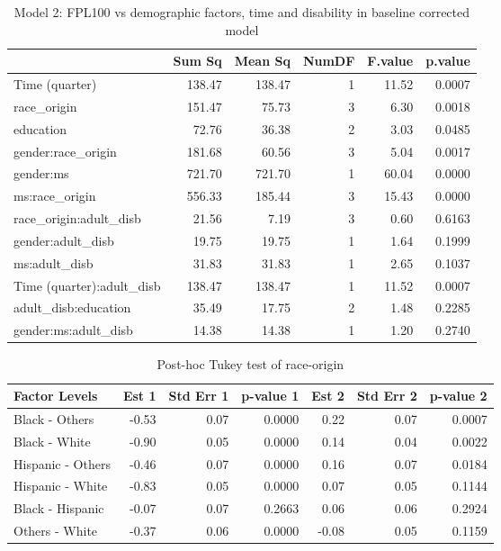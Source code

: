 \documentclass[11pt]{extarticle} %
\begin{document}
\noindent
\begin{table}[H]
\footnotesize
\centering
\begin{tabular}{lrrrrr}
  \hline
 & Sum Sq & Mean Sq & NumDF & F.value & p.value \\ 
  \hline
  Time (quarter) & 138.47 & 138.47 & 1 & 11.52 & 0.0007 \\ 
  race\_origin & 151.47 & 75.73 & 3 & 6.30 & 0.0018 \\ 
  education & 72.76 & 36.38 & 2 & 3.03 & 0.0485 \\ 
  gender:race\_origin & 181.68 & 60.56 & 3 & 5.04 & 0.0017 \\ 
  gender:ms & 721.70 & 721.70 & 1 & 60.04 & 0.0000 \\ 
  ms:race\_origin & 556.33 & 185.44 & 3 & 15.43 & 0.0000 \\ 
  race\_origin:adult\_disb & 21.56 & 7.19 & 3 & 0.60 & 0.6163 \\ 
  gender:adult\_disb & 19.75 & 19.75 & 1 & 1.64 & 0.1999 \\ 
  ms:adult\_disb & 31.83 & 31.83 & 1 & 2.65 & 0.1037 \\ 
  Time (quarter):adult\_disb & 138.47 & 138.47 & 1 & 11.52 & 0.0007 \\ 
  adult\_disb:education & 35.49 & 17.75 & 2 & 1.48 & 0.2285 \\ 
  gender:ms:adult\_disb & 14.38 & 14.38 & 1 & 1.20 & 0.2740 \\ 
   \hline
\end{tabular}
\caption{Model 2: FPL100 vs demographic factors, time and disability in baseline corrected model} 
\label{tab:Anova2}
\end{table}

\begin{table}[H]
\footnotesize
\centering
\begin{tabular}{lrrrrrr}
  \hline
Factor Levels & Est 1 & Std Err 1 & p-value 1 & Est 2 & Std Err 2 & p-value 2 \\ 
  \hline
 Black - Others & -0.53 & 0.07 & 0.0000 & 0.22 & 0.07 & 0.0007 \\ 
   Black - White & -0.90 & 0.05 & 0.0000 & 0.14 & 0.04 & 0.0022 \\ 
   Hispanic - Others & -0.46 & 0.07 & 0.0000 & 0.16 & 0.07 & 0.0184 \\ 
   Hispanic - White & -0.83 & 0.05 & 0.0000 & 0.07 & 0.05 & 0.1144 \\ 
   Black - Hispanic & -0.07 & 0.07 & 0.2663 & 0.06 & 0.06 & 0.2924 \\ 
   Others - White & -0.37 & 0.06 & 0.0000 & -0.08 & 0.05 & 0.1159 \\ 
   \hline
\end{tabular}
\caption{Post-hoc Tukey test of race-origin} 
\label{tab:RaceOrigin}
\end{table}
\end{document}

